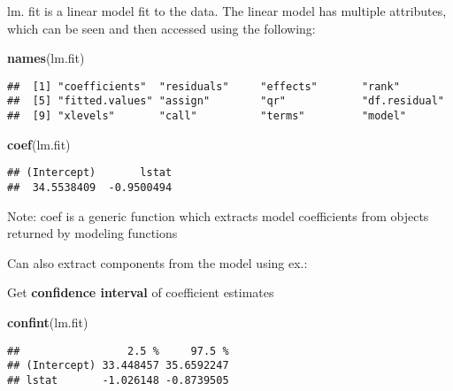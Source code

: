 \documentclass[]{article}
\newenvironment{Shaded}{\begin{snugshade}}{\end{snugshade}}
\newcommand{\KeywordTok}[1]{\textcolor[rgb]{0.13,0.29,0.53}{\textbf{#1}}}
\newcommand{\CommentTok}[1]{\textcolor[rgb]{0.56,0.35,0.01}{\textit{#1}}}
\newcommand{\OperatorTok}[1]{\textcolor[rgb]{0.81,0.36,0.00}{\textbf{#1}}}
\newcommand{\NormalTok}[1]{#1}
\begin{document}
lm. fit is a linear model fit to the data. The linear model has multiple
attributes, which can be seen and then accessed using the following:

\begin{Shaded}
\begin{Highlighting}[]
\KeywordTok{names}\NormalTok{(lm.fit)}
\end{Highlighting}
\end{Shaded}

\begin{verbatim}
##  [1] "coefficients"  "residuals"     "effects"       "rank"         
##  [5] "fitted.values" "assign"        "qr"            "df.residual"  
##  [9] "xlevels"       "call"          "terms"         "model"
\end{verbatim}

\begin{Shaded}
\begin{Highlighting}[]
\KeywordTok{coef}\NormalTok{(lm.fit)}
\end{Highlighting}
\end{Shaded}

\begin{verbatim}
## (Intercept)       lstat 
##  34.5538409  -0.9500494
\end{verbatim}

Note: coef is a generic function which extracts model coefficients from
objects returned by modeling functions

Can also extract components from the model using ex.:

\begin{Shaded}
\end{Shaded}

Get \textbf{confidence interval} of coefficient estimates

\begin{Shaded}
\begin{Highlighting}[]
\KeywordTok{confint}\NormalTok{(lm.fit)}
\end{Highlighting}
\end{Shaded}

\begin{verbatim}
##                 2.5 %     97.5 %
## (Intercept) 33.448457 35.6592247
## lstat       -1.026148 -0.8739505
\end{verbatim}
\end{document}
